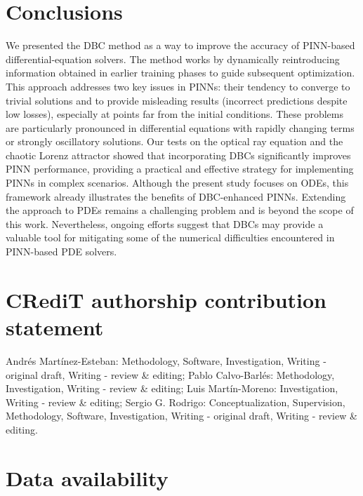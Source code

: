
\section{Conclusions}\label{sec:dbc_conclusions}

We presented the DBC method as a way to improve the accuracy of PINN-based differential-equation solvers. The method works by dynamically reintroducing information obtained in earlier training phases to guide subsequent optimization. This approach addresses two key issues in PINNs: their tendency to converge to trivial solutions and to provide misleading results (incorrect predictions despite low losses), especially at points far from the initial conditions. These problems are particularly pronounced in differential equations with rapidly changing terms or strongly oscillatory solutions. Our tests on the optical ray equation and the chaotic Lorenz attractor showed that incorporating DBCs significantly improves PINN performance, providing a practical and effective strategy for implementing PINNs in complex scenarios. Although the present study focuses on ODEs, this framework already illustrates the benefits of DBC-enhanced PINNs. Extending the approach to PDEs remains a challenging problem and is beyond the scope of this work. Nevertheless, ongoing efforts suggest that DBCs may provide a valuable tool for mitigating some of the numerical difficulties encountered in PINN-based PDE solvers.

\section*{CRediT authorship contribution statement}

Andrés Martínez-Esteban: Methodology, Software, Investigation, Writing - original draft, Writing - review \& editing; Pablo Calvo-Barlés: Methodology, Investigation, Writing - review \& editing; Luis Martín-Moreno: Investigation, Writing - review \& editing; Sergio G. Rodrigo: Conceptualization, Supervision, Methodology, Software, Investigation, Writing - original draft, Writing - review \& editing.

\section*{Data availability}


